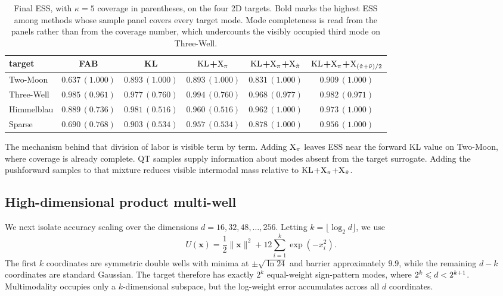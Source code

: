 \documentclass{article}
\begin{document}
\begin{table}[htb]
    \centering
    \begin{tabular}{lccccc}
        \toprule
        target & {\color{blue}FAB} & KL & $\mathrm{KL}$+$\mathrm{X}_\pi$ & $\mathrm{KL}$+$\mathrm{X}_\pi$+$\mathrm{X}_{\hat\pi}$ & $\mathrm{KL}$+$\mathrm{X}_\pi$+$\mathrm{X}_{(\hat\pi+\bar\nu)/2}$ \\
        \midrule
        Two-Moon   & {\color{blue}$0.637\,(1.000)$} & $0.893\,(1.000)$ & $0.893\,(1.000)$ & $0.831\,(1.000)$ & $\mathbf{0.909}\,(1.000)$ \\
        Three-Well & {\color{blue}$\mathbf{0.985}\,(0.961)$} & $0.977\,(0.760)$ & $0.994\,(0.760)$ & $0.968\,(0.977)$ & $0.982\,(0.971)$ \\
        Himmelblau & {\color{blue}$0.889\,(0.736)$} & $0.981\,(0.516)$ & $0.960\,(0.516)$ & $0.962\,(1.000)$ & $\mathbf{0.973}\,(1.000)$ \\
        Sparse     & {\color{blue}$0.690\,(0.768)$} & $0.903\,(0.534)$ & $0.957\,(0.534)$ & $0.878\,(1.000)$ & $\mathbf{0.956}\,(1.000)$ \\
        \bottomrule
    \end{tabular}
    \caption{Final ESS, with $\kappa=5$ coverage in parentheses, on the four 2D targets. Bold marks the highest ESS among methods whose sample panel covers every target mode. {\color{blue}Mode completeness is read from the panels rather than from the coverage number, which undercounts the visibly occupied third mode on Three-Well.}}
    \label{tab: 2d-benchmark-summary}
\end{table}

The mechanism behind that division of labor is visible term by term. Adding $\mathrm{X}_\pi$ leaves ESS near the forward KL value on Two-Moon, where coverage is already complete. QT samples supply information about modes absent from the target surrogate. Adding the pushforward samples to that mixture reduces visible intermodal mass relative to $\mathrm{KL}$+$\mathrm{X}_\pi$+$\mathrm{X}_{\hat\pi}$.

\subsection{High-dimensional product multi-well}
\label{subsec: highd}

We next isolate accuracy scaling over the dimensions
$d=16,32,48,\ldots,256$. Letting $k=\lfloor\log_2 d\rfloor$, we use
\begin{equation}
    U(\mathbf{x})=\frac12\lVert\mathbf{x}\rVert^2
    +12\sum_{i=1}^{k}\exp(-x_i^2).
    \label{eq: highd-potential}
\end{equation}
The first $k$ coordinates are symmetric double wells with minima at $\pm\sqrt{\ln 24}$ and barrier approximately $9.9$, while the remaining $d-k$ coordinates are standard Gaussian. The target therefore has exactly $2^k$ equal-weight sign-pattern modes, where $2^k\leqslant d<2^{k+1}$. Multimodality occupies only a $k$-dimensional subspace, but the log-weight error accumulates across all $d$ coordinates.
\end{document}
